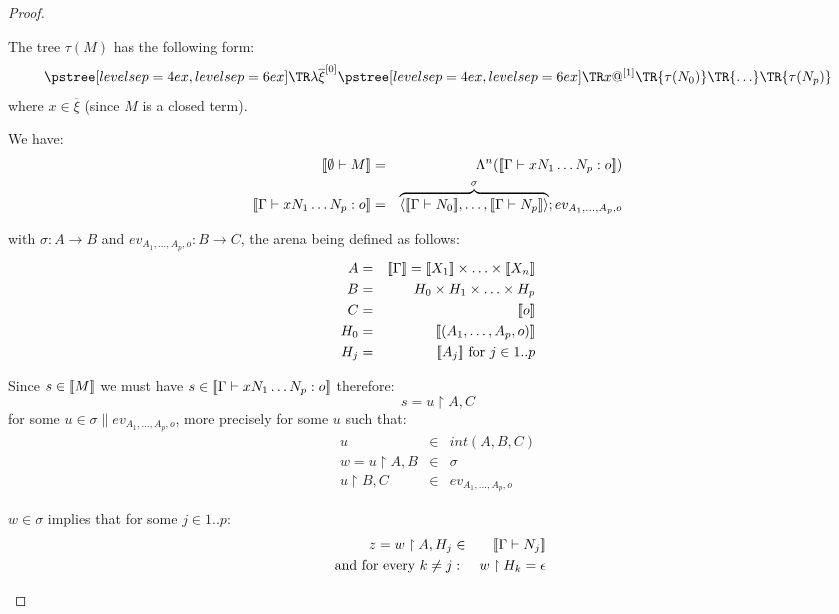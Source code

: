 \begin{proof}
\begin{itemize}
    The tree $\tau(M)$ has the following form:
    $$ \tree[levelsep=6ex]{\lambda \overline{\xi}^{[0]}}
        { \tree[levelsep=6ex]{x @^{[1]}}
            {   \TR{\tau(N_0)} \TR{\ldots} \TR{\tau(N_p)}}}
    $$
    where $x \in \overline{\xi}$ (since $M$ is a closed term).

    We have:
    \begin{eqnarray*}
    \sem{ \emptyset \vdash M} &=& \Lambda^n( \sem{\Gamma \vdash x N_1 \ldots N_p : o} ) \\
    \sem{\Gamma \vdash x N_1 \ldots N_p : o} &=& \overbrace{\langle \sem{\Gamma \vdash N_0}, \ldots, \sem{\Gamma \vdash N_p} \rangle}^\sigma ; ev_{A_1,\ldots,A_p,o}
    \end{eqnarray*}

    with $\sigma : A \longrightarrow B$ and $ev_{A_1,\ldots,A_p,o} : B \longrightarrow C$, the arena being defined as follows:
    \begin{eqnarray*}
        A &=& \sem{\Gamma} = \sem{X_1} \times \ldots \times \sem{X_n}\\
        B &=& H_0 \times H_1 \times \ldots \times H_p \\
        C &=& \sem{o}\\
        H_0 &=& \sem{(A_1,\ldots,A_p,o)} \\
        H_j &=& \sem{A_j} \mbox{ for }j \in 1..p
    \end{eqnarray*}

    Since $s \in {[\![M ]\!]}$ we must have $s\in {[\![\Gamma \vdash x N_1 \ldots N_p : o ]\!]}$ therefore:
    \begin{equation}
        s = u \upharpoonright A, C \label{eq:def_s}
    \end{equation}
    for some $u \in \sigma \parallel ev_{A_1,\ldots,A_p,o}$, more precisely for some $u$ such that:
    \begin{eqnarray}
        u &\in& int(A,B,C) \nonumber \\
        w = u \upharpoonright A,B & \in& \sigma       \label{eq:def_w}\\
        u \upharpoonright B,C & \in & ev_{A_1,\ldots,A_p,o} \nonumber
    \end{eqnarray}

    $w \in \sigma$ implies that for some $j \in 1..p$:
    \begin{eqnarray}
        z = w \upharpoonright A, H_j &\in& {[\![ \Gamma \vdash N_j ]\!]}  \label{eq:def_z} \\
        \mbox{ and for every } k\neq j &:& w \upharpoonright H_k = \epsilon \label{eq:b}
    \end{eqnarray}


\end{itemize}
\end{proof}
